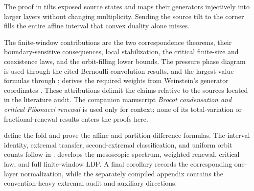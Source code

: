 The proof in  tilts exposed source states and maps
their generators injectively into larger layers without changing
multiplicity.  Sending the source tilt to the corner fills the entire affine
interval that convex duality alone misses.

The finite-window contributions are the two correspondence theorems,
their boundary-sensitive consequences, local stabilization, the critical
finite-size and coexistence laws, and the orbit-filling lower bounds.  The
pressure phase diagram is used through the cited Bernoulli-convolution
results, and the largest-value formulas through
\cite{KocabovaMasakovaPelantova2005}; 
derives the required weights from Weinstein's generator coordinates
\cite{Weinstein2016}.  These attributions delimit the claims relative to the
sources located in the literature audit.  The companion manuscript
\emph{Brocot condensation and critical Fibonacci renewal} is used only for
context; none of its total-variation or fractional-renewal results enters
the proofs here.

 define the fold and prove the
affine and partition-difference formulas.  The interval identity, extremal
transfer, second-extremal classification, and uniform orbit counts follow in
.
 develops the mesoscopic spectrum, weighted renewal,
critical law, and full finite-window LDP.  A final corollary records the corresponding
one-layer normalization, while the separately compiled appendix contains
the convention-heavy extremal audit and auxiliary directions.
